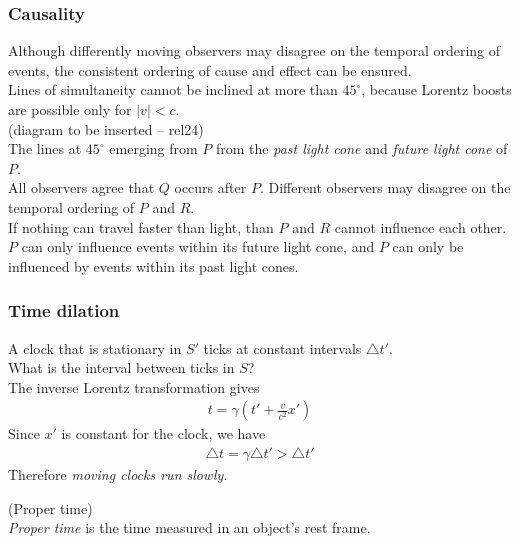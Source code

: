 \documentclass[a4paper]{article}
\begin{document}
\subsubsection{Causality}
Although differently moving observers may disagree on the temporal ordering of events, the consistent ordering of cause and effect can be ensured.\\
Lines of simultaneity cannot be inclined at more than $45^\circ$, because Lorentz boosts are possible only for $|v|<c$.\\
(diagram to be inserted -- rel24)\\
The lines at $45^\circ$ emerging from $P$ from the \emph{past light cone} and \emph{future light cone} of $P$.\\
All observers agree that $Q$ occurs after $P$. Different observers may disagree on the temporal ordering of $P$ and $R$.\\
If nothing can travel faster than light, than $P$ and $R$ cannot influence each other.\\
$P$ can only influence events within its future light cone, and $P$ can only be influenced by events within its past light cones.

\subsubsection{Time dilation}
A clock that is stationary in $S'$ ticks at constant intervals $\triangle t'$.\\
What is the interval between ticks in $S$?\\
The inverse Lorentz transformation gives
\begin{equation*}
\begin{aligned}
t = \gamma\left(t'+\frac{v}{c^2}x'\right)
\end{aligned}
\end{equation*}
Since $x'$ is constant for the clock, we have
\begin{equation*}
\begin{aligned}
\triangle t = \gamma \triangle t' > \triangle t'
\end{aligned}
\end{equation*}
Therefore \emph{moving clocks run slowly}.

\begin{defi} (Proper time)\\
\emph{Proper time} is the time measured in an object's rest frame.
\end{defi}
\end{document}
